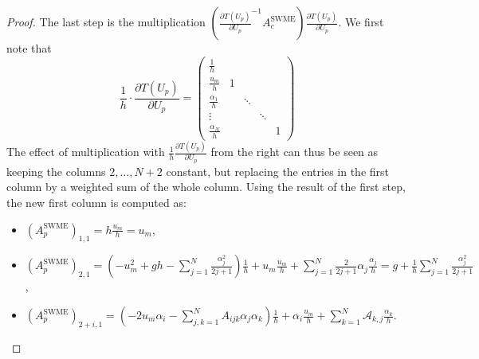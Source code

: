 \documentclass[a4paper, 11pt]{article}
\begin{document}
\begin{proof}
    The last step is the multiplication $\left( \frac{\partial T\left(U_{p}\right)}{\partial U_{p}}^{-1} A^{\textrm{SWME}}_{c}\right) \frac{\partial  T\left(U_{p}\right)}{\partial U_{p}}$.
    We first note that
    \begin{equation}
        \frac{1}{h} \cdot \frac{\partial  T\left(U_{p}\right)}{\partial U_{p}} = \left(\begin{array}{ccccc}
        \frac{1}{h} & & & &\\
         \frac{u_m}{h}& 1 & & &\\
         \frac{\alpha_1}{h}& & \ddots & &\\
        \vdots & & & \ddots &\\
        \frac{\alpha_N }{h}& & & & 1
        \end{array}\right)
    \end{equation}
    The effect of multiplication with $\frac{1}{h}\frac{\partial T\left(U_{p}\right)}{\partial U_{p}}$ from the right can thus be seen as keeping the columns $2,\ldots, N+2$ constant, but replacing the entries in the first column by a weighted sum of the whole column. Using the result of the first step, the new first column is computed as:
    \begin{itemize}
        \item[(1)] $(A^{\textrm{SWME}}_p)_{1,1} = h \frac{u_m}{h} = u_m$,
        \item[(2)] $(A^{\textrm{SWME}}_p)_{2,1} = \left( - u_m^2 + gh - \sum\limits_{j=1}^{N} \frac{\alpha_j^2}{2j+1}\right) \frac{1}{h} + u_m \frac{u_m}{h} + \sum\limits_{j=1}^{N} \frac{2}{2 j+1} \alpha_j \frac{\alpha_j}{h} = g + \frac{1}{h} \sum\limits_{j=1}^{N} \frac{\alpha_j^2}{2 j+1} $,
        \item[(2+i)] $(A^{\textrm{SWME}}_p)_{2+i,1} = \left( -2 u_m \alpha_i - \sum\limits_{j,k=1}^{N} A_{ijk} \alpha_j \alpha_k \right) \frac{1}{h} + \alpha_i \frac{u_m}{h} + \sum\limits_{k=1}^{N} \mathcal{A}_{k,j} \frac{\alpha_k}{h}$.


\end{itemize}
\end{proof}
\end{document}
